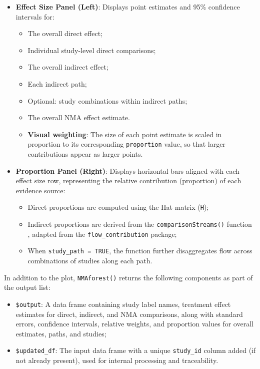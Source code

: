 \begin{itemize}
  \item \textbf{Effect Size Panel (Left)}: Displays point estimates and 95\% confidence intervals for:
    \begin{itemize}
      \item The overall direct effect;
      \item Individual study-level direct comparisons;
      \item The overall indirect effect;
      \item Each indirect path;
      \item Optional: study combinations within indirect paths;
      \item The overall NMA effect estimate.
      \item \textbf{Visual weighting}: The size of each point estimate is scaled in proportion to its corresponding \texttt{proportion} value, so that larger contributions appear as larger points.
    \end{itemize}

  \item \textbf{Proportion Panel (Right)}: Displays horizontal bars aligned with each effect size row, representing the relative contribution (proportion) of each evidence source:
    \begin{itemize}
      \item Direct proportions are computed using the Hat matrix (\texttt{H});
      \item Indirect proportions are derived from the \texttt{comparisonStreams()} function \citet{Papakonstantinou2018}, adapted from the \texttt{flow\_contribution} package;
      \item When \texttt{study\_path = TRUE}, the function further disaggregates flow across combinations of studies along each path.
    \end{itemize}
\end{itemize}

In addition to the plot, \texttt{NMAforest()} returns the following components as part of the output list:

\begin{itemize}
  \item \texttt{\$output}: A data frame containing study label names, treatment effect estimates for direct, indirect, and NMA comparisons, along with standard errors, confidence intervals, relative weights, and proportion values for overall estimates, paths, and studies;
  \item \texttt{\$updated\_df}: The input data frame with a unique \texttt{study\_id} column added (if not already present), used for internal processing and traceability.
\end{itemize}

